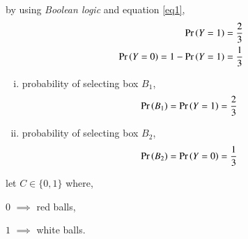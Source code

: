 \documentclass[journal,12pt,twocolumn]{IEEEtran}
\begin{document}
by using \textit{Boolean logic} and equation \eqref{eq1},
\begin{align}
    \Pr\left(Y=1\right)=\frac{2}{3}\\
    \Pr\left(Y=0\right)=1-\Pr\left(Y=1\right)=\frac{1}{3}
\end{align}

\begin{enumerate}[(i)]
\item
probability of selecting box $B_1$,
\begin{align}\label{eq2}
    \Pr\left(B_1\right)=\Pr\left(Y=1\right)=\frac{2}{3}
\end{align}
\item
probability of selecting box $B_2$,
\begin{align}\label{eq3}
    \Pr\left(B_2\right)=\Pr\left(Y=0\right)=\frac{1}{3}
\end{align}
\end{enumerate}

let $C \in \{0,1\}$ where, 

$0$ $\implies$ red balls,

$1$ $\implies$ white balls.

\begin{table}[h!]
\centering
\caption{Table of number of balls}
\label{table1}
\end{table}


\begin{table}[h!]
\centering
\caption{Table of probability of taking balls from each box}
\label{Table2}
\end{table}
\end{document}
